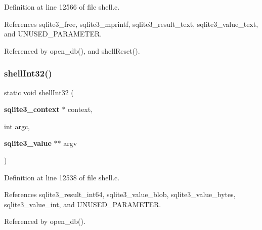 Definition at line 12566 of file shell.\+c.



References sqlite3\+\_\+free, sqlite3\+\_\+mprintf, sqlite3\+\_\+result\+\_\+text, sqlite3\+\_\+value\+\_\+text, and U\+N\+U\+S\+E\+D\+\_\+\+P\+A\+R\+A\+M\+E\+T\+ER.



Referenced by open\+\_\+db(), and shell\+Reset().


\mbox{\label{shell_8c_a5619fd1ae7a844bff224c7eb6d75ac95}} 
\subsubsection{shell\+Int32()}
{\footnotesize\ttfamily static void shell\+Int32 (\begin{DoxyParamCaption}\item[{\textbf{ sqlite3\+\_\+context} $\ast$}]{context,  }\item[{int}]{argc,  }\item[{\textbf{ sqlite3\+\_\+value} $\ast$$\ast$}]{argv }\end{DoxyParamCaption})\hspace{0.3cm}{\ttfamily [static]}}



Definition at line 12538 of file shell.\+c.



References sqlite3\+\_\+result\+\_\+int64, sqlite3\+\_\+value\+\_\+blob, sqlite3\+\_\+value\+\_\+bytes, sqlite3\+\_\+value\+\_\+int, and U\+N\+U\+S\+E\+D\+\_\+\+P\+A\+R\+A\+M\+E\+T\+ER.



Referenced by open\+\_\+db().



